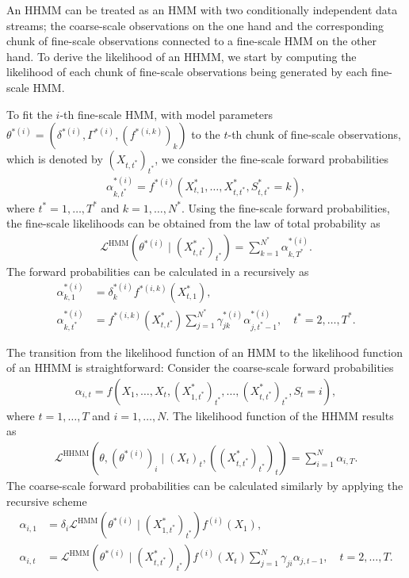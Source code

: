 \documentclass[article]{jss}
\begin{document}
An HHMM can be treated as an HMM with two conditionally independent data streams; the coarse-scale observations on the one hand and the corresponding chunk of fine-scale observations connected to a fine-scale HMM on the other hand. To derive the likelihood of an HHMM, we start by computing the likelihood of each chunk of fine-scale observations being generated by each fine-scale HMM. 

To fit the $i$-th fine-scale HMM, with model parameters $\theta^{*(i)}=(\delta^{*(i)}, \Gamma^{*(i)},(f^{*(i,k)})_k)$ to the $t$-th chunk of fine-scale observations, which is denoted by $(X_{t,t^*})_{t^*}$, we consider the fine-scale forward probabilities 
\begin{align*}
\alpha^{*(i)}_{k,t^*}=f^{*(i)}(X^*_{t,1},\dots,X^*_{t,t^*}, S^*_{t,t^*}=k),
\end{align*}
where $t^*=1,\dots,T^*$ and $k=1,\dots,N^*$. Using the fine-scale forward probabilities, the fine-scale likelihoods can be obtained from the law of total probability as
\begin{align*}
\mathcal{L}^\text{HMM}(\theta^{*(i)}\mid (X^*_{t,t^*})_{t^*})=\sum_{k=1}^{N^*}\alpha^{*(i)}_{k,T^*}.
\end{align*}
The forward probabilities can be calculated in a recursively as
\begin{align*}
\alpha^{*(i)}_{k,1} &= \delta^{*(i)}_k f^{*(i,k)}(X^*_{t,1}), \\
\alpha^{*(i)}_{k,t^*} &= f^{*(i,k)}(X^*_{t,t^*})\sum_{j=1}^{N^*}\gamma^{*(i)}_{jk}\alpha^{*(i)}_{j,t^*-1}, \quad t^*=2,\dots,T^*.
\end{align*}

The transition from the likelihood function of an HMM to the likelihood function of an HHMM is straightforward: Consider the coarse-scale forward probabilities
\begin{align*}
\alpha_{i,t}=f(X_1,\dots,X_t,(X^*_{1,t^*})_{t^*},\dots,(X^*_{t,t^*})_{t^*}, S_t=i),
\end{align*}
where $t=1,\dots,T$ and $i=1,\dots,N$. The likelihood function of the HHMM results as
\begin{align*}
\mathcal{L}^\text{HHMM}(\theta,(\theta^{*(i)})_i\mid (X_t)_t,((X^*_{t,t^*})_{t^*})_t)=\sum_{i=1}^{N}\alpha_{i,T}.
\end{align*}
The coarse-scale forward probabilities can be calculated similarly by applying the recursive scheme
\begin{align*}
\alpha_{i,1} &= \delta_i \mathcal{L}^\text{HMM}(\theta^{*(i)}\mid (X^*_{1,t^*})_{t^*})f^{(i)}(X_1), \\
\alpha_{i,t} &= \mathcal{L}^\text{HMM}(\theta^{*(i)}\mid (X^*_{t,t^*})_{t^*}) f^{(i)}(X_t)\sum_{j=1}^{N}\gamma_{ji}\alpha_{j,t-1}, \quad t=2,\dots,T.
\end{align*}
\end{document}
